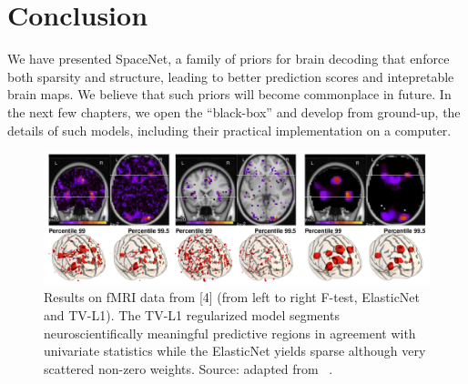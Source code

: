 \section{Conclusion}
We have presented SpaceNet, a family of priors for brain decoding that enforce both sparsity and structure, leading to better prediction scores and intepretable brain maps. We believe that such priors will become commonplace in future.
In the next few chapters, we open the ``black-box'' and develop from ground-up, the details of such models, including their practical implementation on a computer.

\begin{figure}[!htbp] 
  \includegraphics[width=1\linewidth]{figures/gramfort_tvl1.png}
  \caption{Results on fMRI data from [4] (from left to right F-test, ElasticNet and TV-L1). The TV-L1 regularized model segments neuroscientifically
    meaningful predictive regions in agreement with univariate statistics while the ElasticNet yields sparse although very scattered non-zero weights. Source: adapted from ~\citep{gramfort2013}.}
  \label{fig:tvl1_regression}
\end{figure}



